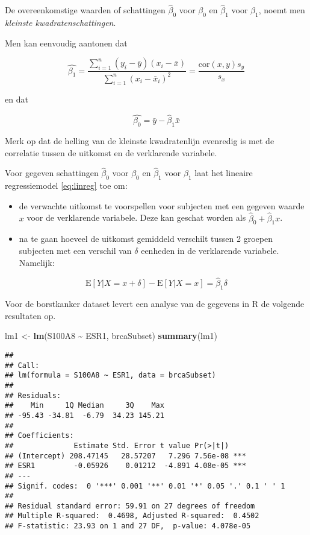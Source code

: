 \documentclass[
  12pt,dutch,coursenotes]{book}
\newenvironment{Shaded}{\begin{snugshade}}{\end{snugshade}}
\newcommand{\KeywordTok}[1]{\textcolor[rgb]{0.13,0.29,0.53}{\textbf{#1}}}
\newcommand{\NormalTok}[1]{#1}
\newcommand{\OperatorTok}[1]{\textcolor[rgb]{0.81,0.36,0.00}{\textbf{#1}}}
\newcommand{\StringTok}[1]{\textcolor[rgb]{0.31,0.60,0.02}{#1}}
\providecommand{\tightlist}{%
  \setlength{\itemsep}{0pt}\setlength{\parskip}{0pt}}
\theoremstyle{definition}
\theoremstyle{definition}
\theoremstyle{definition}
\theoremstyle{remark}
\begin{document}
De overeenkomstige waarden of schattingen \(\hat{\beta}_0\) voor \(\beta_0\) en \(\hat{\beta}_1\) voor \(\beta_1\), noemt men \emph{kleinste kwadratenschattingen}.

Men kan eenvoudig aantonen dat

\[\hat{\beta_1}= \frac{\sum\limits_{i=1}^n (y_i-\bar y)(x_i-\bar x)}{\sum\limits_{i=1}^n (x_i-\bar x_i)^2}=\frac{\mbox{cor}(x,y)s_y}{s_x} \]

en dat

\[\hat{\beta_0}=\bar y - \hat{\beta}_1 \bar x \]

Merk op dat de helling van de kleinste kwadratenlijn evenredig is met de correlatie tussen de uitkomst en de verklarende variabele.

Voor gegeven schattingen \(\hat{\beta}_0\) voor \(\beta_0\) en \(\hat{\beta}_1\) voor \(\beta_1\) laat het lineaire regressiemodel \eqref{eq:linreg} toe om:

\begin{itemize}
\tightlist
\item
  de verwachte uitkomst te voorspellen voor subjecten met een gegeven
  waarde \(x\) voor de verklarende variabele. Deze kan geschat worden als \(\hat{\beta}_0+\hat{\beta}_1x\).
\item
  na te gaan hoeveel de uitkomst gemiddeld verschilt tussen 2 groepen subjecten met een verschil van \(\delta\) eenheden in de verklarende variabele. Namelijk:
\end{itemize}

\[\text{E}\left[Y|X=x+\delta\right]-\text{E}\left[Y|X=x\right]= \hat{\beta}_1\delta\]

Voor de borstkanker dataset levert een analyse van de gegevens in R de volgende resultaten op.

\begin{Shaded}
\begin{Highlighting}[]
\NormalTok{lm1 \textless{}{-}}\StringTok{ }\KeywordTok{lm}\NormalTok{(S100A8 }\OperatorTok{\textasciitilde{}}\StringTok{ }\NormalTok{ESR1, brcaSubset)}
\KeywordTok{summary}\NormalTok{(lm1)}
\end{Highlighting}
\end{Shaded}

\begin{verbatim}
## 
## Call:
## lm(formula = S100A8 ~ ESR1, data = brcaSubset)
## 
## Residuals:
##    Min     1Q Median     3Q    Max 
## -95.43 -34.81  -6.79  34.23 145.21 
## 
## Coefficients:
##              Estimate Std. Error t value Pr(>|t|)    
## (Intercept) 208.47145   28.57207   7.296 7.56e-08 ***
## ESR1         -0.05926    0.01212  -4.891 4.08e-05 ***
## ---
## Signif. codes:  0 '***' 0.001 '**' 0.01 '*' 0.05 '.' 0.1 ' ' 1
## 
## Residual standard error: 59.91 on 27 degrees of freedom
## Multiple R-squared:  0.4698, Adjusted R-squared:  0.4502 
## F-statistic: 23.93 on 1 and 27 DF,  p-value: 4.078e-05
\end{verbatim}
\end{document}
